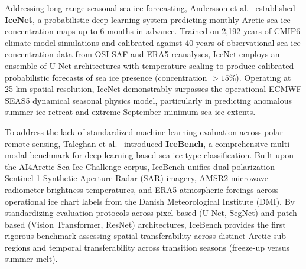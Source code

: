Addressing long-range seasonal sea ice forecasting, Andersson et al.~\cite{andersson2021icenet} established \textbf{IceNet}, a probabilistic deep learning system predicting monthly Arctic sea ice concentration maps up to 6 months in advance. Trained on 2,192 years of CMIP6 climate model simulations and calibrated against 40 years of observational sea ice concentration data from OSI-SAF and ERA5 reanalyses, IceNet employs an ensemble of U-Net architectures with temperature scaling to produce calibrated probabilistic forecasts of sea ice presence (concentration $>15\%$). Operating at 25-km spatial resolution, IceNet demonstrably surpasses the operational ECMWF SEAS5 dynamical seasonal physics model, particularly in predicting anomalous summer ice retreat and extreme September minimum sea ice extents.

To address the lack of standardized machine learning evaluation across polar remote sensing, Taleghan et al.~\cite{taleghan2025icebench} introduced \textbf{IceBench}, a comprehensive multi-modal benchmark for deep learning-based sea ice type classification. Built upon the AI4Arctic Sea Ice Challenge corpus, IceBench unifies dual-polarization Sentinel-1 Synthetic Aperture Radar (SAR) imagery, AMSR2 microwave radiometer brightness temperatures, and ERA5 atmospheric forcings across operational ice chart labels from the Danish Meteorological Institute (DMI). By standardizing evaluation protocols across pixel-based (U-Net, SegNet) and patch-based (Vision Transformer, ResNet) architectures, IceBench provides the first rigorous benchmark assessing spatial transferability across distinct Arctic sub-regions and temporal transferability across transition seasons (freeze-up versus summer melt).


